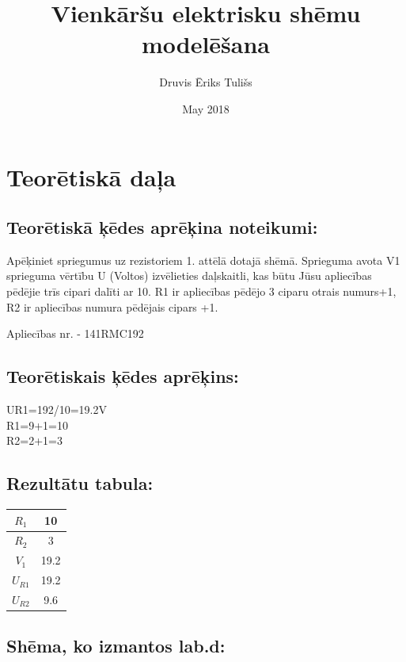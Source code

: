 \documentclass{report}
\title{Vienkāršu elektrisku shēmu modelēšana}
\author{Druvis Ēriks Tulišs }
\date{May 2018}
\begin{document}
\maketitle

\chapter{Teorētiskā daļa}

\section{Teorētiskā ķēdes aprēķina noteikumi:}
    Apēķiniet spriegumus uz rezistoriem 1. attēlā dotajā shēmā. Sprieguma avota V1 sprieguma
    vērtību U (Voltos) izvēlieties daļskaitli, kas būtu Jūsu apliecības pēdējie trīs cipari dalīti ar
    10. R1 ir apliecības pēdējo 3 ciparu otrais numurs+1, R2 ir apliecības numura pēdējais cipars +1.

\begin{flushleft}
    Apliecības nr. - 141RMC192
\end{flushleft}

\section{Teorētiskais ķēdes aprēķins:}

\begin{flushleft}
    UR1=192/10=19.2V\\
    R1=9+1=10\\
    R2=2+1=3\\
\end{flushleft}

\section{Rezultātu tabula:}

\begin{tabular}{|c|c|}
    \hline
        $R_1$ & 10\\
    \hline
        $R_2$ & 3  \\
    \hline
        $V_1$ & 19.2  \\
    \hline
        $U_{R1}$ & 19.2  \\
    \hline
        $U_{R2}$ & 9.6 \\
    \hline
\end{tabular}

\section{Shēma, ko izmantos lab.d:}
\end{document}
